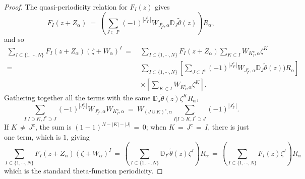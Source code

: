 \documentclass[10pt,a4paper]{amsart}
\def\bD{{\mathbb {D}}}
\begin{document}
\begin{proof}The quasi-periodicity relation for $F_I(z)$
gives
$$F_I(z+Z_\alpha)\ =\ (\sum_{J\subset I^c}(-1)^{|J_{I^c}^c|} W_{J_{I^c}^c,\alpha} \bD_J\widetilde{\theta}(z) )
R_\alpha ,$$
and so 
\begin{align}\nonumber
\sum_{I\subset\{1,\cdots ,N\}} F_I(z+Z_\alpha) (\zeta+W_\alpha)^I\ =\ &
\sum_{I\subset\{1,\cdots ,N\}} F_I(z+Z_\alpha)\sum _{K\subset I}  W_{K_I^c,\alpha}\zeta^K \nonumber\\
=\ &\sum_{I\subset\{1,\cdots,N\}} [\sum_{J\subset I^c}(-1)^{|J_{I^c}^c|} W_{J_{I^c}^c,\alpha} \bD_J
\widetilde{\theta}(z) )R_\alpha]\nonumber\\&
\times [ \sum _{K\subset I} W_{K_I^c,\alpha}\zeta^K].\nonumber
\end{align} 
Gathering together all the terms with the same $\bD_J\widetilde{\theta}(z) \zeta^K R_\alpha$,
 $$ \sum_{I| I\supset K, I^c\supset J} (-1)^{|J_{I^c}^c|}W_{J_{I^c}^c,\alpha}W_{K_I^c,\alpha}
\ =\ W_{(J\cup K)^c,\alpha }\sum_{I| I\supset K, I^c\supset J} (-1)^{|J_{I^c}^c|}.$$
If $K\,\neq\, J^c$, the sum is $(1-1)^{N-|K|-|J|} \, =\, 0$; when $K\,=\,J^c\, =\, I$, there is just one term,
which is $1$, giving 
$$\sum_{I\subset\{1,\cdots ,N\}} F_I(z+Z_\alpha) (\zeta+W_\alpha)^I\, =\, 
(\sum_{I\subset\{1,\cdots,N\}}\bD_{I^c}\widetilde{\theta}
(z)\zeta^I)R_\alpha\, =\, (\sum_{I\subset\{1,\cdots,N\}} F_I(z) \zeta^I)R_\alpha$$
which is the standard theta-function periodicity.
\end{proof}
\end{document}
